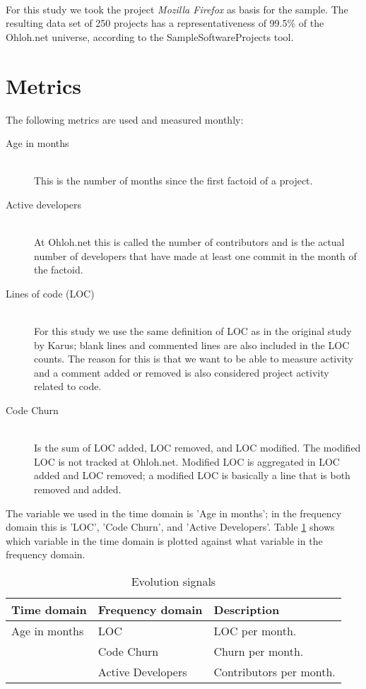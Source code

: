 \paragraph{}
For this study we took the project \emph{Mozilla Firefox }\rm as basis for
the sample. The resulting data set of 250 projects has a representativeness of
99.5\% of the Ohloh.net universe, according to the SampleSoftwareProjects tool.

\section{Metrics}
The following metrics are used and measured monthly:

\begin{description}
	\item[Age in months] \hfill \\
		This is the number of months since the first factoid of a project.

	\item[Active developers] \hfill \\
		At Ohloh.net this is called the number of contributors and is the actual
		number of developers that have made at least one commit in the month of the
		factoid.
	
	\item[Lines of code (LOC)] \hfill \\
		For this study we use the same definition of LOC as in the original study by
		Karus; blank lines and commented lines are also included in the LOC counts.
		The reason for this is that we want to be able to measure activity and a
		comment added or removed is also considered project activity related to code.

	\item[Code Churn] \hfill \\
		Is the sum of LOC added, LOC removed, and LOC modified. The modified LOC is
		not tracked at Ohloh.net. Modified LOC is aggregated in LOC added and LOC
		removed; a modified LOC is basically a line that is both removed and added.

\end{description}

\noindent
The variable we used in the time domain is 'Age in months'; in the
frequency domain this is 'LOC', 'Code Churn', and 'Active Developers'. Table
\ref{tab:series} shows which variable in the time domain is plotted against
what variable in the frequency domain.

\begin{table}
\centering
	\caption{Evolution signals}
	\begin{tabular}{| p{4cm} | p{4cm} | p{4cm} |}
	\hline
	\bfseries{Time domain}\rm & \bfseries{Frequency domain}\rm &
	\bfseries{Description}\rm
	\\
	\hline Age in months	& LOC & LOC per month. \\
							& Code Churn & Churn per month. \\
							& Active Developers & Contributors per month. \\ \hline
	\end{tabular}
\label{tab:series}
\end{table}

